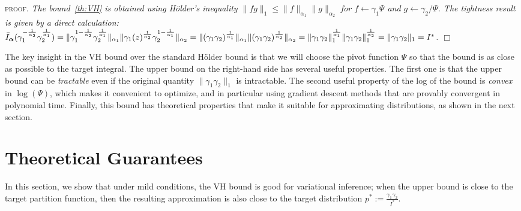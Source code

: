 \documentclass[reqno,oneside,letterpaper,10pt]{article}
\newcommand{\Holder}{H\"older\xspace}
\def\z{z}
\def\proba{p}
\newenvironment{proof}{\textsc{proof.}\it}{\hfill{$\Box$}}
\begin{document}
\begin{proof}
The bound~\eqref{th:VH} is obtained using \Holder's inequality $\|fg\|_1\le\|f\|_{\alpha_1}\|g\|_{\alpha_2}$ for $f\leftarrow \gamma_1\Psi$ and $g\leftarrow \gamma_2/\Psi$.
The tightness result is given by a direct calculation:
{\small
$ \bar I_\balpha( \gamma_1^{-\frac {1}{\alpha_2}}  \gamma_2^{\frac{1} {\alpha_1}}) = \|\gamma_1^{1-\frac {1}{\alpha_2}} \gamma_2^{\frac{1} {\alpha_1}}\|_{\alpha_1}\|\gamma_1(\z)^{\frac{1} {\alpha_2}}\gamma_2^{1-\frac {1}{\alpha_1}} \|_{\alpha_2}=\|(\gamma_1\gamma_2)^{\frac {1}{\alpha_1}}\|_{\alpha_1}\|(\gamma_1\gamma_2)^{\frac {1}{\alpha_2}}\|_{\alpha_2}
=\|\gamma_1\gamma_2\|_1^{\frac {1}{\alpha_1}} \|\gamma_1\gamma_2\|_1^{\frac {1}{\alpha_2}} =  \|\gamma_1\gamma_2\|_1=I^*$.
}
\end{proof}

The key insight in the VH bound over the standard \Holder bound 
is that we will choose the pivot function $\Psi$ so that the bound is as close as possible to the target integral.
The upper bound on the right-hand side has several useful properties. The first one is that the upper bound 
can be \emph{tractable} even if the original quantity $\|\gamma_1\gamma_2\|_1$ is intractable. 
The second useful property of the log of the bound is \emph{convex} in $\log(\Psi)$, which makes it 
convenient to optimize, and in particular using gradient descent methods that are
provably convergent in polynomial time. Finally, this bound has theoretical properties that make it 
suitable for approximating distributions, as shown in the next section.





\section{Theoretical Guarantees}
In this section, we show that under mild conditions, the VH bound is good for variational inference; 
when the upper bound is close to the target partition function, then the resulting approximation
is also close to the target distribution $\proba^* :=\frac{\gamma_1\gamma_2}{I^*} $.
\end{document}
